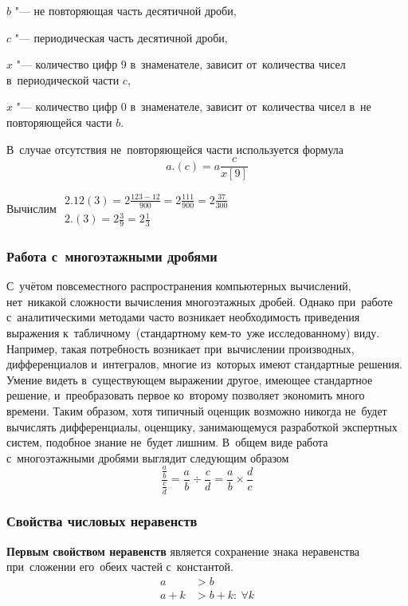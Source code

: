 \documentclass[]{scrartcl}
\begin{document}
$b$ "--- не повторяющая часть десятичной дроби,

$c$ "--- периодическая часть десятичной дроби,

$x$ "--- количество цифр 9 в~знаменателе, зависит от~количества чисел в~периодической части $c$,

$x$ "--- количество цифр 0 в~знаменателе, зависит от~количества чисел в~не повторяющейся части $b$.

В~случае отсутствия не~повторяющейся части используется формула
\begin{equation}\label{eq:periodic-to-frac-2}
a.(c)=a\frac{c}{x[9]}
\end{equation}

\begin{Thexmpl}\label{ex:periodic-to-frac-2}
	Вычислим
	$\begin{aligned}
		2.12(3) = 2\frac{123-12}{900} = 2\frac{111}{900} = 2\frac{37}{300} \\
		2.(3) = 2\frac{3}{9} =2\frac{1}{3} 
	\end{aligned}$
	
\end{Thexmpl}

\subsubsection{Работа с~многоэтажными дробями}

С~учётом повсеместного распространения компьютерных вычислений, нет~никакой сложности вычисления многоэтажных дробей. Однако при~работе с~аналитическими методами часто возникает необходимость приведения выражения к~табличному~(стандартному кем-то~уже исследованному) виду. Например, такая потребность возникает при~вычислении производных, дифференциалов и~интегралов, многие из~которых имеют стандартные решения. Умение видеть в~существующем выражении другое, имеющее стандартное решение, и~преобразовать первое ко~второму позволяет экономить много времени. Таким образом, хотя типичный оценщик возможно никогда не~будет вычислять дифференциалы, оценщику, занимающемуся разработкой экспертных систем, подобное знание не~будет лишним.
В~общем виде работа с~многоэтажными дробями выглядит следующим образом
\begin{equation}\label{eq:multilevel-frac}
\frac{\frac{a}{b}}{\frac{c}{d}} = \frac{a}{b} \div \frac{c}{d} = \frac{a}{b} \times \frac{d}{c}
\end{equation}

\subsubsection{Свойства числовых неравенств}
\textbf{Первым свойством неравенств} является сохранение знака неравенства при~сложении его~обеих частей с~константой.
\begin{equation}\label{eq:enequalities-property1}
	\begin{aligned}
	a&>b \\
	a+k&>b+k:\ \forall k\\
	\end{aligned}
\end{equation}
\end{document}
